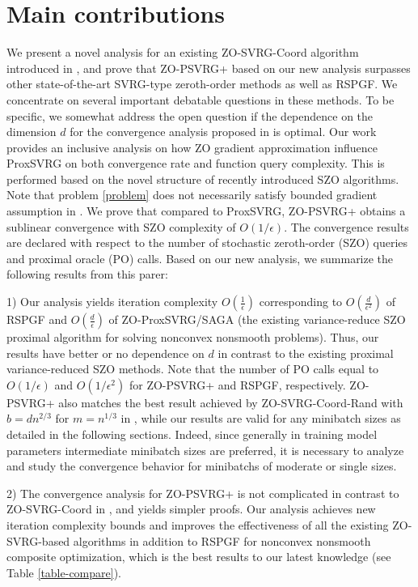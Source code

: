 \documentclass{article}
\theoremstyle{definition}
\theoremstyle{remark}
\begin{document}
\section{Main contributions}
We present a novel analysis for an existing ZO-SVRG-Coord algorithm introduced in \cite{liu2018zeroth,ji2019improved}, and
prove that ZO-PSVRG+ based on  our new analysis surpasses other state-of-the-art SVRG-type zeroth-order methods as well as RSPGF.
We concentrate on several important debatable questions in these methods. To be specific, we somewhat address the open question if the dependence on the dimension $d$ for the convergence analysis proposed in \cite{liu2018zeroth} is optimal. Our work provides an inclusive analysis on how ZO gradient approximation influence ProxSVRG on both  convergence rate and function query complexity. This
is performed based on the novel structure of recently introduced SZO algorithms.
Note that problem \eqref{problem} does not necessarily satisfy bounded gradient assumption in \cite{ghadimi2016accelerated,huang2019faster}.
We prove that compared to
ProxSVRG, ZO-PSVRG+ obtains a sublinear convergence with SZO complexity of $O(1/\epsilon)$.
The convergence results are declared with respect to the number of stochastic zeroth-order (SZO) queries and proximal oracle (PO) calls. 
Based on our new analysis, we summarize the following results from this parer:

1) Our analysis yields iteration complexity $O(\frac{1}{{\epsilon}})$ corresponding to $O(\frac{d}{\epsilon^2})$ of RSPGF \cite{ghadimi2016accelerated}  and $O(\frac{d}{\epsilon})$ of ZO-ProxSVRG/SAGA  \cite{huang2019faster} (the existing variance-reduce SZO proximal algorithm for solving nonconvex nonsmooth problems).  
Thus, our results have better or no dependence on
$d$ in contrast to the existing proximal variance-reduced SZO methods. Note that the number of PO calls equal to $O(1/\epsilon)$  and $O(1/\epsilon^2)$ for ZO-PSVRG+ and RSPGF, respectively.  ZO-PSVRG+ also matches the best result achieved by ZO-SVRG-Coord-Rand with $b = d n^{2/3}$ for $m = n^{1/3}$ in \cite{ji2019improved}, while our results are valid for any minibatch sizes as detailed in the following sections.  
Indeed, since generally  in training model parameters intermediate minibatch sizes are preferred, it is necessary to analyze and study the convergence behavior for minibatchs of moderate or single sizes.


2) The convergence analysis for ZO-PSVRG+ is not complicated in contrast to  ZO-SVRG-Coord in \cite{liu2018zeroth,ji2019improved}, and yields simpler proofs. Our analysis achieves new iteration complexity bounds and improves the effectiveness of  all the existing ZO-SVRG-based algorithms in addition to RSPGF for nonconvex nonsmooth composite optimization, which is the best results to our latest knowledge (see Table \ref{table-compare}). 
\end{document}
